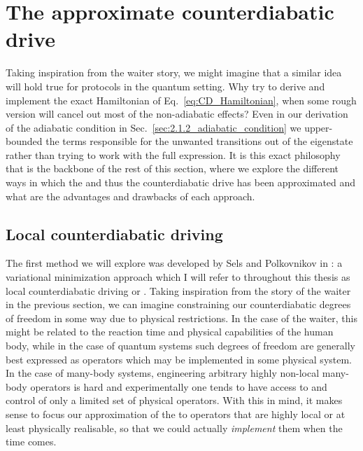     \section{The approximate counterdiabatic drive}\label{sec:2.4_approximate_CD}

    Taking inspiration from the waiter story, we might imagine that a similar idea will hold true for  protocols in the quantum setting. Why try to derive and implement the exact Hamiltonian of Eq.~\eqref{eq:CD_Hamiltonian}, when some rough version will cancel out most of the non-adiabatic effects? Even in our derivation of the adiabatic condition in Sec.~\ref{sec:2.1.2_adiabatic_condition} we upper-bounded the terms responsible for the unwanted transitions out of the eigenstate rather than trying to work with the full expression. It is this exact philosophy that is the backbone of the rest of this section, where we explore the different ways in which the  and thus the counterdiabatic drive has been approximated and what are the advantages and drawbacks of each approach. 
 
    \subsection{Local counterdiabatic driving}\label{sec:2.4.1_LCD}

    The first method we will explore was developed by Sels and Polkovnikov in \cite{sels_minimizing_2017}: a variational minimization approach which I will refer to throughout this thesis as local counterdiabatic driving or . Taking inspiration from the story of the waiter in the previous section, we can imagine constraining our counterdiabatic degrees of freedom in some way due to physical restrictions. In the case of the waiter, this might be related to the reaction time and physical capabilities of the human body, while in the case of quantum systems such degrees of freedom are generally best expressed as operators which may be implemented in some physical system. In the case of many-body systems, engineering arbitrary highly non-local many-body operators is hard and experimentally one tends to have access to and control of only a limited set of physical operators. With this in mind, it makes sense to focus our approximation of the  to operators that are highly local or at least physically realisable, so that we could actually \emph{implement} them when the time comes.

